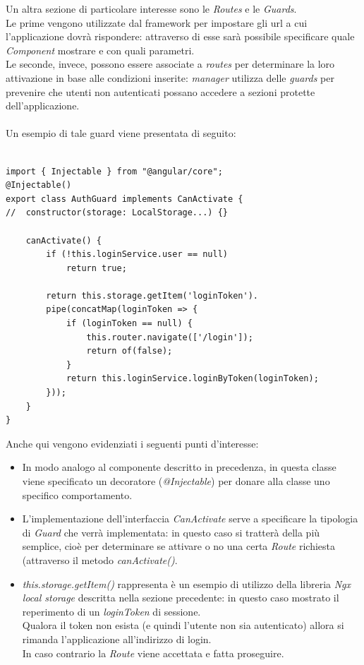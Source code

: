 \documentclass[12pt]{article}
\begin{document}
Un altra sezione di particolare interesse sono le \textit{Routes} e le \textit{Guards}.\\
Le prime vengono utilizzate dal framework per impostare gli url a cui l'applicazione dovrà rispondere: attraverso di esse sarà possibile specificare quale \textit{Component} mostrare e con quali parametri.\\
Le seconde, invece, possono essere associate a \textit{routes} per determinare la loro attivazione in base alle condizioni inserite: \textit{manager} utilizza delle \textit{guards} per prevenire che utenti non autenticati possano accedere a sezioni protette dell'applicazione.\\\\
Un esempio di tale guard viene presentata di seguito:
\begin{lstlisting}

import { Injectable } from "@angular/core";
@Injectable()
export class AuthGuard implements CanActivate {
//  constructor(storage: LocalStorage...) {}

    canActivate() {
        if (!this.loginService.user == null)
            return true;

        return this.storage.getItem('loginToken').
        pipe(concatMap(loginToken => {
            if (loginToken == null) {
                this.router.navigate(['/login']);
                return of(false);
            }
            return this.loginService.loginByToken(loginToken);
        }));
    }
}
\end{lstlisting}
Anche qui vengono evidenziati i seguenti punti d'interesse:
\begin{itemize}
\item In modo analogo al componente descritto in precedenza, in questa classe viene specificato un decoratore (\textit{@Injectable}) per donare alla classe uno specifico comportamento.
\item L'implementazione dell'interfaccia \textit{CanActivate} serve a specificare la tipologia di \textit{Guard} che verrà implementata: in questo caso si tratterà della più semplice, cioè per determinare se attivare o no una certa \textit{Route} richiesta (attraverso il metodo \textit{canActivate()}.
\item \textit{this.storage.getItem()} rappresenta è un esempio di utilizzo della libreria \textit{Ngx local storage} descritta nella sezione precedente: in questo caso mostrato il reperimento di un \textit{loginToken} di sessione.\\
Qualora il token non esista (e quindi l'utente non sia autenticato) allora si rimanda l'applicazione all'indirizzo di login.\\
In caso contrario la \textit{Route} viene accettata e fatta proseguire.
\end{itemize}
\newpage
\end{document}

